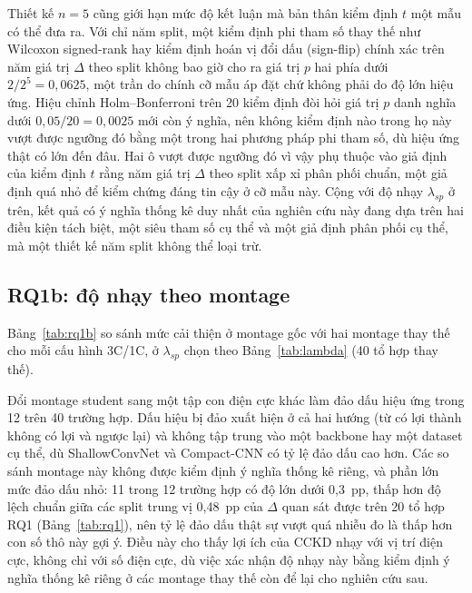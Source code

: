\documentclass[11pt,a4paper,twoside,asymmetric]{article}
\begin{document}
Thiết kế $n=5$ cũng giới hạn mức độ kết luận mà bản thân kiểm định $t$ một mẫu có thể đưa ra. Với chỉ năm split, một kiểm định phi tham số thay thế như Wilcoxon signed-rank hay kiểm định hoán vị đổi dấu (sign-flip) chính xác trên năm giá trị $\Delta$ theo split không bao giờ cho ra giá trị $p$ hai phía dưới $2/2^5=0{,}0625$, một trần do chính cỡ mẫu áp đặt chứ không phải do độ lớn hiệu ứng. Hiệu chỉnh Holm--Bonferroni trên 20 kiểm định đòi hỏi giá trị $p$ danh nghĩa dưới $0{,}05/20=0{,}0025$ mới còn ý nghĩa, nên không kiểm định nào trong họ này vượt được ngưỡng đó bằng một trong hai phương pháp phi tham số, dù hiệu ứng thật có lớn đến đâu. Hai ô vượt được ngưỡng đó vì vậy phụ thuộc vào giả định của kiểm định $t$ rằng năm giá trị $\Delta$ theo split xấp xỉ phân phối chuẩn, một giả định quá nhỏ để kiểm chứng đáng tin cậy ở cỡ mẫu này. Cộng với độ nhạy $\lambda_{sp}$ ở trên, kết quả có ý nghĩa thống kê duy nhất của nghiên cứu này đang dựa trên hai điều kiện tách biệt, một siêu tham số cụ thể và một giả định phân phối cụ thể, mà một thiết kế năm split không thể loại trừ.

\subsection{RQ1b: độ nhạy theo montage}
\label{sec:rq1b}

Bảng~\ref{tab:rq1b} so sánh mức cải thiện ở montage gốc với hai montage thay thế cho mỗi cấu hình 3C/1C, ở $\lambda_{sp}$ chọn theo Bảng~\ref{tab:lambda} (40 tổ hợp thay thế).

Đổi montage student sang một tập con điện cực khác làm đảo dấu hiệu ứng trong 12 trên 40 trường hợp. Dấu hiệu bị đảo xuất hiện ở cả hai hướng (từ có lợi thành không có lợi và ngược lại) và không tập trung vào một backbone hay một dataset cụ thể, dù ShallowConvNet và Compact-CNN có tỷ lệ đảo dấu cao hơn. Các so sánh montage này không được kiểm định ý nghĩa thống kê riêng, và phần lớn mức đảo dấu nhỏ: 11 trong 12 trường hợp có độ lớn dưới 0,3~pp, thấp hơn độ lệch chuẩn giữa các split trung vị 0,48~pp của $\Delta$ quan sát được trên 20 tổ hợp RQ1 (Bảng~\ref{tab:rq1}), nên tỷ lệ đảo dấu thật sự vượt quá nhiễu đo là thấp hơn con số thô này gợi ý. Điều này cho thấy lợi ích của CCKD nhạy với vị trí điện cực, không chỉ với số điện cực, dù việc xác nhận độ nhạy này bằng kiểm định ý nghĩa thống kê riêng ở các montage thay thế còn để lại cho nghiên cứu sau.
\end{document}
